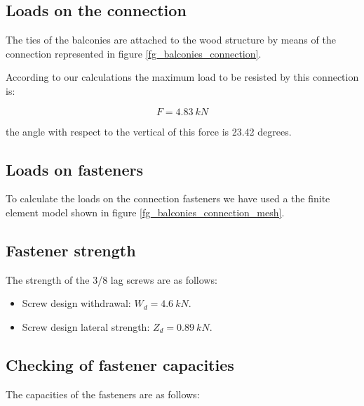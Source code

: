 \subsection{Loads on the connection}
The ties of the balconies are attached to the wood structure by means of the
connection represented in figure \ref{fg_balconies_connection}.


According to our calculations the maximum load to be resisted by this connection is:

\begin{equation}
  F= 4.83\ kN
\end{equation}

\noindent the angle with respect to the vertical of this force is 23.42 degrees.


\subsection{Loads on fasteners}
To calculate the loads on the connection fasteners we have used a the finite element model shown in figure \ref{fg_balconies_connection_mesh}.


\subsection{Fastener strength}
The strength of the 3/8 lag screws are as follows:

\begin{itemize}
\item Screw design withdrawal: $W_d= 4.6\ kN$.
\item Screw design lateral strength: $Z_d= 0.89\ kN$.
\end{itemize}

\subsection{Checking of fastener capacities}
The capacities of the fasteners are as follows:


